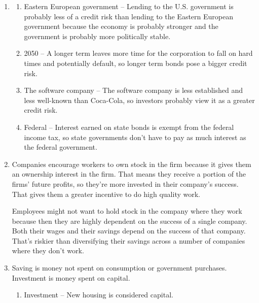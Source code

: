 \documentclass{article}
\begin{document}
\begin{enumerate}

\item

	\begin{enumerate}
	
	\item Eastern European government  -- Lending to the U.S. government is probably less of a credit risk than lending to the Eastern European government because the economy is probably stronger and the government is probably more politically stable.
	
	\item 2050 -- A longer term leaves more time for the corporation to fall on hard times and potentially default, so longer term bonds pose a bigger credit risk.
	
	\item The software company -- The software company is less established and less well-known than Coca-Cola, so investors probably view it as a greater credit risk.
	
	\item Federal -- Interest earned on state bonds is exempt from the federal income tax, so state governments don't have to pay as much interest as the federal government.
	
	\end{enumerate}
	
\item Companies encourage workers to own stock in the firm because it gives them an ownership interest in the firm. That means they receive a portion of the firms’ future profits, so they’re more invested in their company’s success. That gives them a greater incentive to do high quality work. 

Employees might not want to hold stock in the company where they work because then they are highly dependent on the success of a single company. Both their wages and their savings depend on the success of that company. That’s riskier than diversifying their savings across a number of companies where they don’t work.

\item Saving is money not spent on consumption or government purchases. Investment is money spent on capital.

	\begin{enumerate}
	
	\item Investment -- New housing is considered capital.
	

\end{enumerate}
\end{enumerate}
\end{document}
